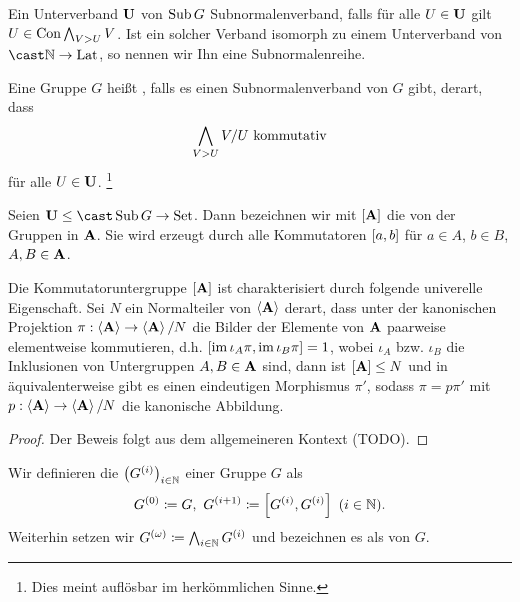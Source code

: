 \begin{definition}
    Ein Unterverband $\mathbf{U}$ von $\mathop{\mathrm{Sub}} G$ Subnormalenverband, falls für alle $U\in \mathbf{U}$ gilt
    $U\in\mathop{\mathrm{Con}} \mathop\mathrm{\bigwedge}_{V>U}V$. Ist ein solcher Verband isomorph zu einem Unterverband von $\cast \nats \to \lattice$, so nennen wir Ihn
    eine Subnormalenreihe. 
\end{definition}

\begin{definition}
    Eine Gruppe $G$ heißt , falls es einen Subnormalenverband von $G$ gibt, derart, dass
    $$
    \Meet_{V>U} V / U\ \textrm{kommutativ}
    $$
    für alle $U\in\bf U$. \footnote{Dies meint auflösbar im herkömmlichen Sinne.}
\end{definition}

\begin{definition}[Kommutatoruntergruppe]
    Seien $\bfU\leq\cast \subobjects G\to \set$. Dann bezeichnen wir mit $\left[\mathbf{A}\right]$ die
     von der Gruppen in $\mathbf{A}$. Sie wird erzeugt durch alle Kommutatoren $\left[a,b\right]$ für $a\in
    A$, $b\in B$, $A,B\in\mathbf{A}$. 
\end{definition}

\begin{lemma}
    Die Kommutatoruntergruppe $\left[\mathbf{A}\right]$ ist charakterisiert durch folgende univerelle Eigenschaft.
    Sei $N$ ein Normalteiler von $\left\langle\mathbf{A}\right\rangle$ derart, dass unter der kanonischen Projektion $\pi:\left\langle\mathbf{A}\right\rangle\rightarrow\left\langle\mathbf{A}\right\rangle/N$ die
    Bilder der Elemente von $\mathbf{A}$ paarweise elementweise kommutieren, d.h. $\left[\mathop{\mathrm{im}}{\iota_A\pi},\mathop{\mathrm{im}}{\iota_B\pi}\right]=1$, wobei $\iota_A$ bzw. $\iota_B$ die Inklusionen von Untergruppen $A,B\in\mathbf{A}$ sind,
    dann ist $\left[\mathbf{A}\right]\leq N$ und in äquivalenterweise gibt es einen eindeutigen Morphismus $\pi'$, sodass
    $\pi=p\pi'$ mit $p:\left\langle\mathbf{A}\right\rangle\rightarrow\left\langle\mathbf{A}\right\rangle/N$ die kanonische Abbildung.
\end{lemma}

\begin{proof}
    Der Beweis folgt aus dem allgemeineren Kontext (TODO).
\end{proof}

\begin{definition}[Kommutatorreihe]
    Wir definieren die  $\sequence{\commutatorseries G i}_{i\in \nats}$ einer Gruppe $G$ als
    $$\commutatorseries G 0 \defeq G,\ \commutatorseries G {i+1} \defeq \commutatorsubgroup {\commutatorseries G i,\commutatorseries G i} \ (i\in\nats).$$
    Weiterhin setzen wir $G^{(\omega)} \mathrel{\mathrel{\mathop:}\mkern-1.2mu=} \mathop\mathrm{\bigwedge}_{i\in\mathbb{N}} G^{(i)}$ und bezeichnen es als
     von $G$.
\end{definition}

